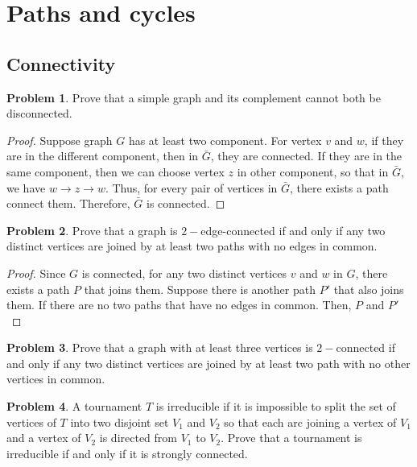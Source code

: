 \documentclass[a4paper,11pt]{article}%
\theoremstyle{remark}
\theoremstyle{definition}
\newtheorem{problem}{Problem}[subsection]
\begin{document}
\section{Paths and cycles}
\subsection{Connectivity}
\begin{problem}
    Prove that a simple graph and its complement cannot both be disconnected.
    \begin{proof}
    Suppose graph $G$ has at least two component.
    For vertex $v$ and $w$, if they are in the different component, then 
    in $\bar{G}$, they are connected. If they are in the same component, 
    then we can choose vertex $z$ in other component, so that in $\bar{G}$,
    we have $w\rightarrow z\rightarrow w$. Thus, for every pair of vertices in 
    $\bar{G}$, there exists a path connect them. Therefore, $\bar{G}$ is connected.
    \end{proof}
\end{problem}
\begin{problem}
    Prove that a graph is $2-$edge-connected if and only if any two distinct 
    vertices are joined by at least two paths with no edges in common.
    \begin{proof}
        Since $G$ is connected, for any two distinct vertices $v$ and $w$ in 
        $G$, there exists a path $P$ that joins them. Suppose there is another 
        path $P'$ that also joins them. If there are no two paths that have no 
        edges in common. Then, $P$ and $P'$ 
    \end{proof}
\end{problem}
\begin{problem}
    Prove that a graph with at least three vertices is $2-$connected if and only if 
    any two distinct vertices are joined by at least two path with no other 
    vertices in common.
\end{problem}
\begin{problem}
    A tournament $T$ is irreducible if it is impossible to split 
    the set of vertices of $T$ into two disjoint set $V_1$ and 
    $V_2$ so that each arc joining a vertex of $V_1$ and a vertex of 
    $V_2$ is directed from $V_1$ to $V_2$.
    Prove that a tournament is irreducible if and only if it is strongly 
    connected.
\end{problem}
\end{document}
